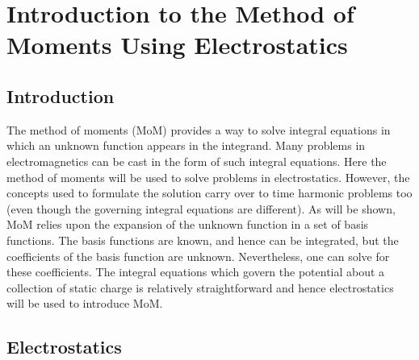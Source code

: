 \chapter[MoM Introduction]{Introduction to the Method of Moments Using
  Electrostatics \label{chap:momIntro}} 


\renewcommand{\thefootnote}{\fnsymbol{footnote}}

\section{Introduction}

The method of moments (MoM) provides a way to solve integral equations
in which an unknown function appears in the integrand.  Many problems
in electromagnetics can be cast in the form of such integral
equations.  Here the method of moments will be used to solve problems
in electrostatics.  However, the concepts used to formulate the
solution carry over to time harmonic problems too (even though the
governing integral equations are different).  As will be shown, MoM
relies upon the expansion of the unknown function in a set of basis
functions.  The basis functions are known, and hence can be
integrated, but the coefficients of the basis function are unknown.
Nevertheless, one can solve for these coefficients.  The integral
equations which govern the potential about a collection of static
charge is relatively straightforward and hence electrostatics will be
used to introduce MoM.

\section{Electrostatics}

